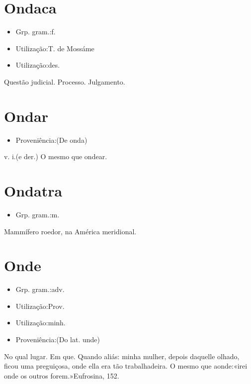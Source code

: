 \section{Ondaca}
\begin{itemize}
\item {Grp. gram.:f.}
\end{itemize}
\begin{itemize}
\item {Utilização:T. de Mossáme}
\end{itemize}
\begin{itemize}
\item {Utilização:des.}
\end{itemize}
Questão judicial.
Processo.
Julgamento.
\section{Ondar}
\begin{itemize}
\item {Proveniência:(De \textunderscore onda\textunderscore )}
\end{itemize}
\textunderscore v. i.\textunderscore  (e der.)
O mesmo que \textunderscore ondear\textunderscore .
\section{Ondatra}
\begin{itemize}
\item {Grp. gram.:m.}
\end{itemize}
Mammífero roedor, na América meridional.
\section{Onde}
\begin{itemize}
\item {Grp. gram.:adv.}
\end{itemize}
\begin{itemize}
\item {Utilização:Prov.}
\end{itemize}
\begin{itemize}
\item {Utilização:minh.}
\end{itemize}
\begin{itemize}
\item {Proveniência:(Do lat. \textunderscore unde\textunderscore )}
\end{itemize}
No qual lugar.
Em que.
Quando aliás: \textunderscore minha mulher, depois daquelle olhado, ficou uma preguiçosa, onde ella era tão trabalhadeira\textunderscore .
O mesmo que \textunderscore aonde\textunderscore :«\textunderscore irei onde os outros forem.\textunderscore »\textunderscore Eufrosina\textunderscore , 152.
